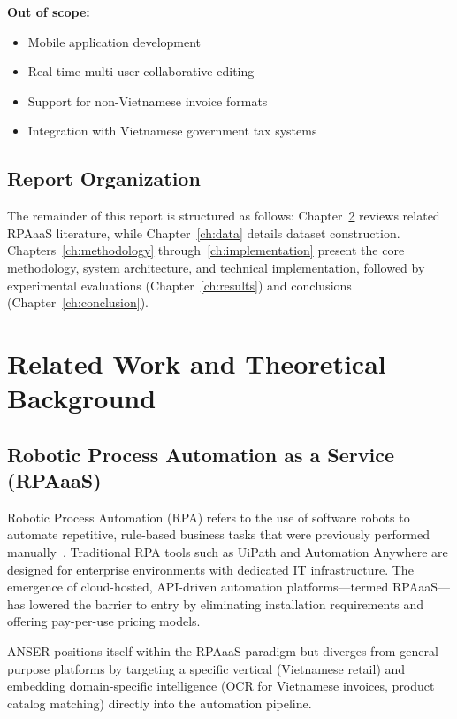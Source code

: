 \documentclass[11pt,a4paper]{report}
\begin{document}
\textbf{Out of scope:}
\begin{itemize}
  \item Mobile application development
  \item Real-time multi-user collaborative editing
  \item Support for non-Vietnamese invoice formats
  \item Integration with Vietnamese government tax systems
\end{itemize}

\section{Report Organization}

The remainder of this report is structured as follows: Chapter~\ref{ch:related} reviews related RPAaaS literature, while Chapter~\ref{ch:data} details dataset construction. Chapters~\ref{ch:methodology} through~\ref{ch:implementation} present the core methodology, system architecture, and technical implementation, followed by experimental evaluations (Chapter~\ref{ch:results}) and conclusions (Chapter~\ref{ch:conclusion}).

\chapter{Related Work and Theoretical Background}
\label{ch:related}

\section{Robotic Process Automation as a Service (RPAaaS)}

Robotic Process Automation (RPA) refers to the use of software robots to automate repetitive, rule-based business tasks that were previously performed manually~\cite{vanderaalst2018}. Traditional RPA tools such as UiPath and Automation Anywhere are designed for enterprise environments with dedicated IT infrastructure. The emergence of cloud-hosted, API-driven automation platforms---termed RPAaaS---has lowered the barrier to entry by eliminating installation requirements and offering pay-per-use pricing models.

ANSER positions itself within the RPAaaS paradigm but diverges from general-purpose platforms by targeting a specific vertical (Vietnamese retail) and embedding domain-specific intelligence (OCR for Vietnamese invoices, product catalog matching) directly into the automation pipeline.
\end{document}
